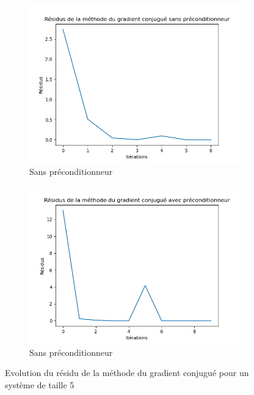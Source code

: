 \documentclass{article}
\begin{document}
\begin{figure}[ht]
  \centering
  \begin{subfigure}{0.35\textwidth}
    \centering
    \includegraphics[width=\linewidth]{Figure_3.png}
    \caption{Sans préconditionneur}
    \label{subfig:5x5_grad_sans}
  \end{subfigure}
  \hfill
  \begin{subfigure}{0.35\textwidth}
    \centering
    \includegraphics[width=\linewidth]{Figure_7.png}
    \caption{Sans préconditionneur}
    \label{subfig:5x5_grad_prcd}
  \end{subfigure}
  \caption{Evolution du résidu de la méthode du gradient conjugué pour un système de taille 5}
  \label{fig:5x5_grad}
\end{figure}
\end{document}
